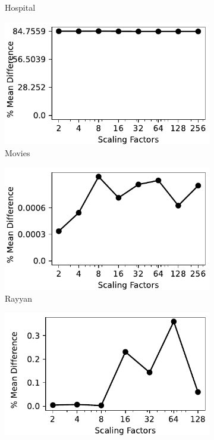 \begin{figure}[!t]
\begin{subfigure}{0.32\textwidth}
    \caption{Hospital}
    \label{fig:mean_hospitals}
\end{subfigure}
\hfill
\begin{subfigure}{0.32\textwidth}
    \includegraphics[width=\textwidth]{figures/plot/mean/mean_diff_movies.pdf}
    \caption{Movies}
    \label{exp:mean_movies}
\end{subfigure}
\hfill
\begin{subfigure}{0.32\textwidth}
    \includegraphics[width=\textwidth]{figures/plot/mean/mean_diff_rayyan.pdf}
    \caption{Rayyan}
    \label{exp:mean_rayyan}
\end{subfigure}
\hfill
\begin{subfigure}{0.32\textwidth}
    \includegraphics[width=\textwidth]{figures/plot/mean/mean_diff_tax.pdf}

\end{subfigure}
\end{figure}
